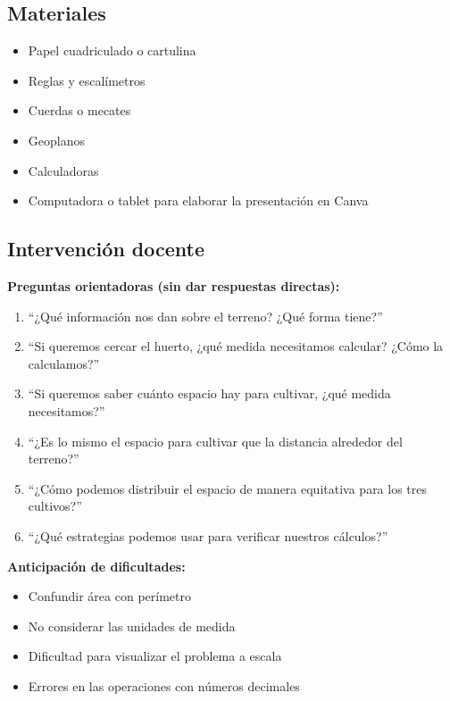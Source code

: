 \documentclass[spanish,letterpaper,oneside]{article}
\begin{document}
\begin{propuestabox}
\subsection{Materiales}

\begin{itemize}
  \item Papel cuadriculado o cartulina
  \item Reglas y escalímetros
  \item Cuerdas o mecates
  \item Geoplanos
  \item Calculadoras
  \item Computadora o tablet para elaborar la presentación en Canva
\end{itemize}

\subsection{Intervención docente}

\textbf{Preguntas orientadoras (sin dar respuestas directas):}

\begin{enumerate}
  \item ``¿Qué información nos dan sobre el terreno? ¿Qué forma tiene?''
  \item ``Si queremos cercar el huerto, ¿qué medida necesitamos calcular? ¿Cómo la calculamos?''
  \item ``Si queremos saber cuánto espacio hay para cultivar, ¿qué medida necesitamos?''
  \item ``¿Es lo mismo el espacio para cultivar que la distancia alrededor del terreno?''
  \item ``¿Cómo podemos distribuir el espacio de manera equitativa para los tres cultivos?''
  \item ``¿Qué estrategias podemos usar para verificar nuestros cálculos?''
\end{enumerate}

\textbf{Anticipación de dificultades:}
\begin{itemize}
  \item Confundir área con perímetro
  \item No considerar las unidades de medida
  \item Dificultad para visualizar el problema a escala
  \item Errores en las operaciones con números decimales
\end{itemize}


\end{propuestabox}
\end{document}
